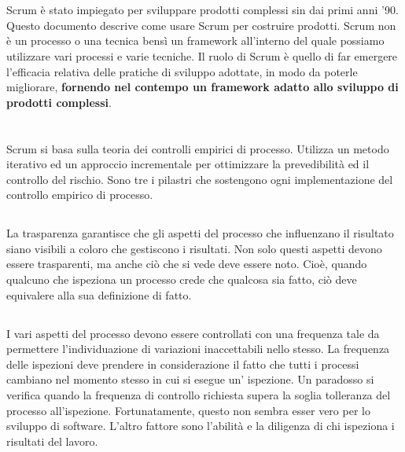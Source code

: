 \newpage
\section*{\color{Blue}{LO SCOPO}}
\label{sec:purpose}
Scrum \`e stato impiegato per sviluppare prodotti complessi sin dai primi anni '90. Questo documento descrive come usare
Scrum per costruire prodotti. Scrum non \`e un processo o una tecnica bens\`i un framework all'interno del quale
possiamo utilizzare vari processi e varie tecniche. Il ruolo di Scrum \`e quello di far emergere l'efficacia relativa
delle pratiche di sviluppo adottate, in modo da poterle migliorare, \textbf{fornendo nel contempo un framework adatto allo
sviluppo di prodotti complessi}.

\section*{\color{Blue}{LA TEORIA  DI SCRUM}}
\label{sec:scrum_theory}
Scrum si basa sulla teoria dei controlli empirici di processo. Utilizza un metodo iterativo ed un approccio incrementale
per ottimizzare la prevedibilit\`a ed il controllo del rischio. Sono tre i pilastri che sostengono ogni implementazione
del controllo empirico di processo.

\subsection*{\color{Blue}{LA PRIMA  COLONNA  \`E LA TRASPARENZA}}
\label{sec:transparency}
La trasparenza garantisce che gli aspetti del processo che influenzano il risultato siano visibili a coloro che
gestiscono i risultati. Non solo questi aspetti devono essere trasparenti, ma anche ci\`o che si vede deve essere noto.
Cio\`e, quando qualcuno che ispeziona un processo crede che qualcosa sia fatto, ci\`o deve equivalere alla sua
definizione di fatto.

\subsection*{\color{Blue}{LA  SECONDA  COLONNA \`E  L'ISPEZIONE}}
\label{sec:inspection}
I vari aspetti del processo devono essere controllati con una frequenza tale da permettere l'individuazione di
variazioni inaccettabili nello stesso. La frequenza delle ispezioni deve prendere in considerazione il fatto che tutti i
processi cambiano nel momento stesso in cui si esegue un' ispezione. Un paradosso si verifica quando la frequenza di
controllo richiesta supera la soglia tolleranza del processo all'ispezione. Fortunatamente, questo non sembra esser vero
per lo sviluppo di software. L'altro fattore sono l'abilit\`a e la diligenza di chi ispeziona i risultati del lavoro.


